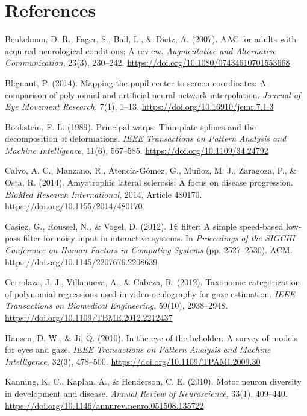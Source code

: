 \documentclass[twocolumn,10pt]{article}
\begin{document}
\section*{References}
\begin{description}
    \item Beukelman, D. R., Fager, S., Ball, L., \& Dietz, A. (2007). AAC for adults with acquired neurological conditions: A review. \textit{Augmentative and Alternative Communication}, 23(3), 230--242. \url{https://doi.org/10.1080/07434610701553668}
    \item Blignaut, P. (2014). Mapping the pupil center to screen coordinates: A comparison of polynomial and artificial neural network interpolation. \textit{Journal of Eye Movement Research}, 7(1), 1--13. \url{https://doi.org/10.16910/jemr.7.1.3}
    \item Bookstein, F. L. (1989). Principal warps: Thin-plate splines and the decomposition of deformations. \textit{IEEE Transactions on Pattern Analysis and Machine Intelligence}, 11(6), 567--585. \url{https://doi.org/10.1109/34.24792}
    \item Calvo, A. C., Manzano, R., Atencia-G{\'o}mez, G., Mu{\~n}oz, M. J., Zaragoza, P., \& Osta, R. (2014). Amyotrophic lateral sclerosis: A focus on disease progression. \textit{BioMed Research International}, 2014, Article 480170. \url{https://doi.org/10.1155/2014/480170}
    \item Casiez, G., Roussel, N., \& Vogel, D. (2012). 1€ filter: A simple speed-based low-pass filter for noisy input in interactive systems. In \textit{Proceedings of the SIGCHI Conference on Human Factors in Computing Systems} (pp. 2527--2530). ACM. \url{https://doi.org/10.1145/2207676.2208639}
    \item Cerrolaza, J. J., Villanueva, A., \& Cabeza, R. (2012). Taxonomic categorization of polynomial regressions used in video-oculography for gaze estimation. \textit{IEEE Transactions on Biomedical Engineering}, 59(10), 2938--2948. \url{https://doi.org/10.1109/TBME.2012.2212437}
    \item Hansen, D. W., \& Ji, Q. (2010). In the eye of the beholder: A survey of models for eyes and gaze. \textit{IEEE Transactions on Pattern Analysis and Machine Intelligence}, 32(3), 478--500. \url{https://doi.org/10.1109/TPAMI.2009.30}
    \item Kanning, K. C., Kaplan, A., \& Henderson, C. E. (2010). Motor neuron diversity in development and disease. \textit{Annual Review of Neuroscience}, 33(1), 409--440. \url{https://doi.org/10.1146/annurev.neuro.051508.135722}

\end{description}
\end{document}
